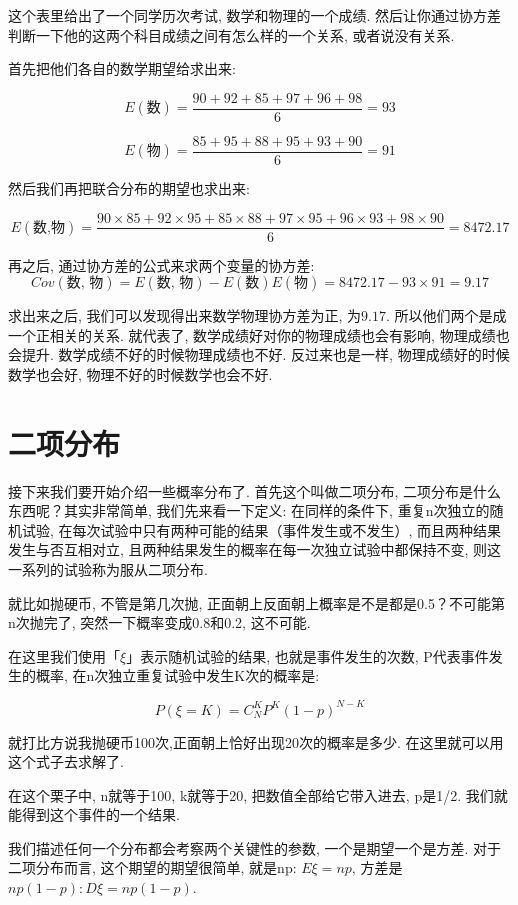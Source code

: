 这个表里给出了一个同学历次考试, 数学和物理的一个成绩. 然后让你通过协方差判断一下他的这两个科目成绩之间有怎么样的一个关系, 或者说没有关系. 

首先把他们各自的数学期望给求出来: 

\[
  E(\mbox{数}) = \frac{90+92+85+97+96+98}{6} = 93
\]

\[
  E(\mbox{物}) = \frac{85+95+88+95+93+90}{6} = 91
\]

然后我们再把联合分布的期望也求出来:

\[
  E(\mbox{数,物}) = \frac{90\times85+92\times95+85\times88+97\times95+96\times93+98\times90}{6} = 8472.17
\]

再之后, 通过协方差的公式来求两个变量的协方差: 
\[Cov(\mbox{数, 物}) = E(\mbox{数, 物}) - E(\mbox{数})E(\mbox{物}) = 8472.17 - 93 \times 91 = 9.17\]

求出来之后, 我们可以发现得出来数学物理协方差为正, 为$9.17$. 所以他们两个是成一个正相关的关系. 就代表了, 数学成绩好对你的物理成绩也会有影响, 物理成绩也会提升. 数学成绩不好的时候物理成绩也不好. 反过来也是一样, 物理成绩好的时候数学也会好, 物理不好的时候数学也会不好. 

\section{二项分布}

接下来我们要开始介绍一些概率分布了. 首先这个叫做二项分布, 二项分布是什么东西呢？其实非常简单, 我们先来看一下定义: 在同样的条件下, 重复n次独立的随机试验, 在每次试验中只有两种可能的结果（事件发生或不发生）, 而且两种结果发生与否互相对立, 且两种结果发生的概率在每一次独立试验中都保持不变, 则这一系列的试验称为服从二项分布. 

就比如抛硬币, 不管是第几次抛, 正面朝上反面朝上概率是不是都是0.5？不可能第n次抛完了, 突然一下概率变成0.8和0.2, 这不可能. 

在这里我们使用「$\xi$」表示随机试验的结果, 也就是事件发生的次数,  P代表事件发生的概率,  在n次独立重复试验中发生K次的概率是: 

\[P(\xi=K) = C_N^KP^K(1-p)^{N-K}\]

就打比方说我抛硬币100次,正面朝上恰好出现20次的概率是多少. 在这里就可以用这个式子去求解了. 

在这个栗子中, n就等于100, k就等于20, 把数值全部给它带入进去, p是1/2. 我们就能得到这个事件的一个结果. 

我们描述任何一个分布都会考察两个关键性的参数, 一个是期望一个是方差. 对于二项分布而言, 这个期望的期望很简单, 就是np: $E\xi = np$, 方差是$np(1-p): D\xi = np(1-p)$. 

